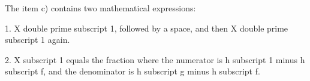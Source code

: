 The item c) contains two mathematical expressions:

1. X double prime subscript 1, followed by a space, and then X double prime subscript 1 again.

2. X subscript 1 equals the fraction where the numerator is h subscript 1 minus h subscript f, and the denominator is h subscript g minus h subscript f.